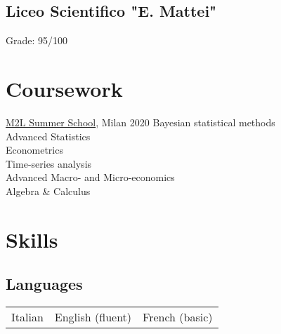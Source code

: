 \documentclass[]{deedy-resume-reversed}
\begin{document}
\begin{minipage}[t]{0.33\textwidth}
\subsection{Liceo Scientifico "E. Mattei"}
\begin{tightemize}
\item Grade: 95/100
\end{tightemize}
\sectionsep





\section{Coursework}

\href{https://www.m2lschool.org/}{M2L Summer School}, Milan 2020
Bayesian statistical methods\\
Advanced Statistics\\
Econometrics\\
Time-series analysis\\
Advanced Macro- and Micro-economics\\
Algebra \& Calculus\\
\sectionsep


\section{Skills}

\subsection{Languages}
\begin{tabular}{ccc}
Italian & English (fluent) & French (basic)\\
\end{tabular}
\sectionsep
\vspace{-\topsep}


\end{minipage}
\end{document}
